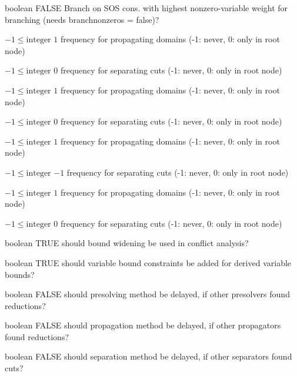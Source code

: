 %
{boolean}%
{FALSE}%
{Branch on SOS cons. with highest nonzero-variable weight for branching (needs branchnonzeros = false)?}%
{}

%
{$-1\leq\textrm{integer}$}%
{$1$}%
{frequency for propagating domains (-1: never, 0: only in root node)}%
{}

%
{$-1\leq\textrm{integer}$}%
{$0$}%
{frequency for separating cuts (-1: never, 0: only in root node)}%
{}

%
{$-1\leq\textrm{integer}$}%
{$1$}%
{frequency for propagating domains (-1: never, 0: only in root node)}%
{}

%
{$-1\leq\textrm{integer}$}%
{$0$}%
{frequency for separating cuts (-1: never, 0: only in root node)}%
{}

%
{$-1\leq\textrm{integer}$}%
{$1$}%
{frequency for propagating domains (-1: never, 0: only in root node)}%
{}

%
{$-1\leq\textrm{integer}$}%
{$-1$}%
{frequency for separating cuts (-1: never, 0: only in root node)}%
{}

%
{$-1\leq\textrm{integer}$}%
{$1$}%
{frequency for propagating domains (-1: never, 0: only in root node)}%
{}

%
{$-1\leq\textrm{integer}$}%
{$0$}%
{frequency for separating cuts (-1: never, 0: only in root node)}%
{}

%
{boolean}%
{TRUE}%
{should bound widening be used in conflict analysis?}%
{}

%
{boolean}%
{TRUE}%
{should variable bound constraints be added for derived variable bounds?}%
{}

%
{boolean}%
{FALSE}%
{should presolving method be delayed, if other presolvers found reductions?}%
{}

%
{boolean}%
{FALSE}%
{should propagation method be delayed, if other propagators found reductions?}%
{}

%
{boolean}%
{FALSE}%
{should separation method be delayed, if other separators found cuts?}%
{}

